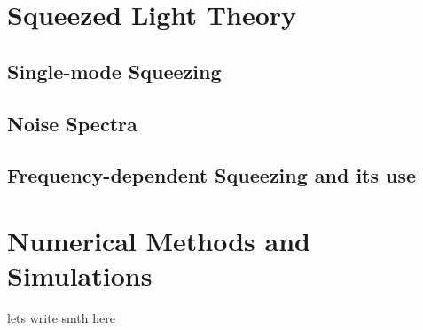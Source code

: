 \section{Squeezed Light Theory}
\subsection{Single-mode Squeezing}
\subsection{Noise Spectra }
\subsection{Frequency-dependent Squeezing and its use}
\hspace{1pt}

\section{Numerical Methods and Simulations}

lets write smth here 
